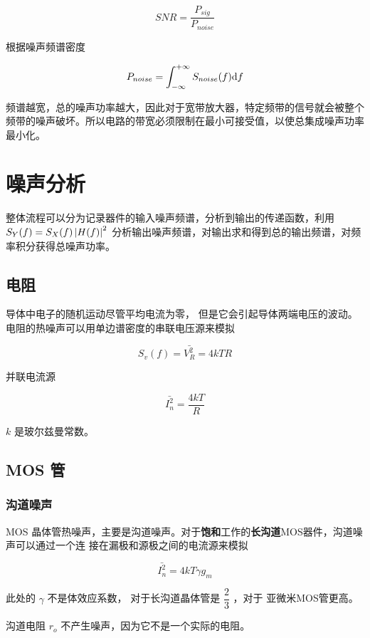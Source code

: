 \documentclass[cn,11pt,chinese,black,simple]{../elegantbook}
\begin{document}
\[SNR = \frac{P_{sig}}{P_{noise}}\]

根据噪声频谱密度 

\[P_{noise} = \int_{-\infty}^{+\infty} S_{noise}(f) \mathrm{d}f \]

频谱越宽，总的噪声功率越大，因此对于宽带放大器，特定频带的信号就会被整个频带的噪声破坏。所以电路的带宽必须限制在最小可接受值，以使总集成噪声功率
最小化。

\section{噪声分析}

整体流程可以分为记录器件的输入噪声频谱，分析到输出的传递函数，利用 \(S_Y(f) = S_X(f) \left| H(f) \right|^2\) 分析输出噪声频谱，对输出求和得到总的输出频谱，对频率积分获得总噪声功率。

\subsection{电阻}

导体中电子的随机运动尽管平均电流为零， 但是它会引起导体两端电压的波动。电阻的热噪声可以用单边谱密度的串联电压源来模拟

\[S_v(f) = \bar{V_R^2 }= 4 k T R\]

并联电流源 

\[\bar{I_n^2} = \dfrac{4 k T}{R}\]

\(k\) 是玻尔兹曼常数。



\subsection{MOS 管}

\subsubsection{沟道噪声}

MOS 晶体管热噪声，主要是沟道噪声。对于\textbf{饱和}工作的\textbf{长沟道}MOS器件，沟道噪声可以通过一个连
接在漏极和源极之间的电流源来模拟

\[\bar{I_n ^2} = 4 k T \gamma g_m \]

此处的 \(\gamma\) 不是体效应系数， 对于长沟道晶体管是 \(\dfrac{2}{3}\) ，对于
亚微米MOS管更高。


沟道电阻 \(r_o\) 不产生噪声，因为它不是一个实际的电阻。
\end{document}
